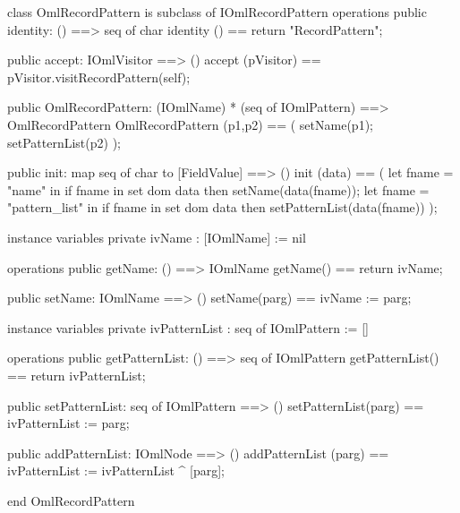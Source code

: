 \begin{vdm_al}
class OmlRecordPattern is subclass of IOmlRecordPattern
operations
  public identity: () ==> seq of char
  identity () == return "RecordPattern";

  public accept: IOmlVisitor ==> ()
  accept (pVisitor) == pVisitor.visitRecordPattern(self);

  public OmlRecordPattern:
      (IOmlName) *
      (seq of IOmlPattern) ==> OmlRecordPattern
  OmlRecordPattern (p1,p2) == 
   ( setName(p1);
     setPatternList(p2) );

  public init: map seq of char to [FieldValue] ==> ()
  init (data) ==
    ( let fname = "name" in
        if fname in set dom data
        then setName(data(fname));
      let fname = "pattern_list" in
        if fname in set dom data
        then setPatternList(data(fname)) );

instance variables
  private ivName : [IOmlName] := nil

operations
  public getName: () ==> IOmlName
  getName() == return ivName;

  public setName: IOmlName ==> ()
  setName(parg) == ivName := parg;

instance variables
  private ivPatternList : seq of IOmlPattern := []

operations
  public getPatternList: () ==> seq of IOmlPattern
  getPatternList() == return ivPatternList;

  public setPatternList: seq of IOmlPattern ==> ()
  setPatternList(parg) == ivPatternList := parg;

  public addPatternList: IOmlNode ==> ()
  addPatternList (parg) == ivPatternList := ivPatternList ^ [parg];

end OmlRecordPattern
\end{vdm_al}

